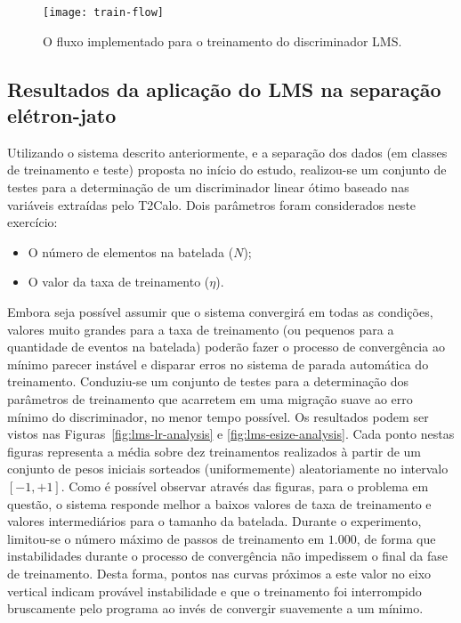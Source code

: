 \begin{figure}
\begin{center}
\texttt{[image: train-flow]}
\end{center}
\caption{O fluxo implementado para o treinamento do discriminador LMS.}
\label{fig:train-flow}
\end{figure}

\subsection{Resultados da aplicação do LMS na separação e\-lé\-tron-jato}

Utilizando o sistema descrito anteriormente, e a separação dos dados (em
classes de treinamento e teste) proposta no início do estudo, realizou-se um
conjunto de testes para a determinação de um discriminador linear ótimo
baseado nas variáveis extraídas pelo T2Calo. Dois parâmetros foram
considerados neste exercício:

\begin{itemize}
\item O número de elementos na batelada ($N$);
\item O valor da taxa de treinamento ($\eta$).
\end{itemize}

Embora seja possível assumir que o sistema convergirá em todas as condições,
valores muito grandes para a taxa de treinamento (ou pequenos para a
quantidade de eventos na batelada) poderão fazer o processo de convergência ao
mínimo parecer instável e disparar erros no sistema de parada automática do
treinamento. Conduziu-se um conjunto de testes para a determinação dos
parâmetros de treinamento que acarretem em uma migração suave ao erro mínimo
do discriminador, no menor tempo possível. Os resultados podem ser vistos nas
Figuras~\ref{fig:lms-lr-analysis} e \ref{fig:lms-esize-analysis}. Cada ponto
nestas figuras representa a média sobre dez treinamentos realizados à partir
de um conjunto de pesos iniciais sorteados (uniformemente) aleatoriamente no
intervalo $[-1, +1]$. Como é possível observar através das figuras, para o
problema em questão, o sistema responde melhor a baixos valores de taxa de
treinamento e valores intermediários para o tamanho da batelada. Durante o
experimento, limitou-se o número máximo de passos de treinamento em $1.000$,
de forma que instabilidades durante o processo de convergência não impedissem
o final da fase de treinamento. Desta forma, pontos nas curvas próximos a este
valor no eixo vertical indicam provável instabilidade e que o treinamento foi
interrompido bruscamente pelo programa ao invés de convergir suavemente a um
mínimo.

